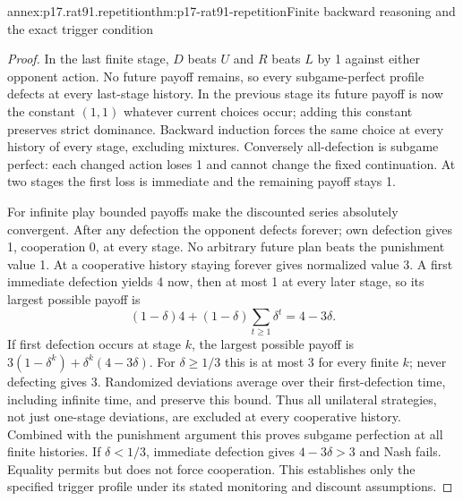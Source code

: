 \begin{annexitem}{annex:p17.rat91.repetition}{thm:p17-rat91-repetition}{Finite backward reasoning and the exact trigger condition}
\begin{proof}
In the last finite stage, \(D\) beats \(U\)
and \(R\) beats \(L\) by 1 against either
opponent action. No future payoff remains, so
every subgame-perfect profile defects at every
last-stage history. In the previous stage its
future payoff is now the constant \((1,1)\)
whatever current choices occur; adding this
constant preserves strict dominance. Backward
induction forces the same choice at every
history of every stage, excluding mixtures.
Conversely all-defection is subgame perfect:
each changed action loses 1 and cannot change
the fixed continuation. At two stages the first
loss is immediate and the remaining payoff
stays 1.

For infinite play bounded payoffs make the
discounted series absolutely convergent. After
any defection the opponent defects forever;
own defection gives 1, cooperation 0, at
every stage. No arbitrary future plan beats
the punishment value 1. At a cooperative
history staying forever gives normalized value
3. A first immediate defection yields 4 now,
then at most 1 at every later stage, so
its largest possible payoff is
\[
 (1-\delta)4+(1-\delta)\sum_{t\geq1}\delta^t
                             =4-3\delta.
\]
If first defection occurs at stage \(k\),
the largest possible payoff is
\(3(1-\delta^k)+\delta^k(4-3\delta)\).
For \(\delta\geq1/3\) this is at most 3
for every finite \(k\); never defecting
gives 3. Randomized deviations average over
their first-defection time, including infinite
time, and preserve this bound. Thus all
unilateral strategies, not just one-stage
deviations, are excluded at every cooperative
history. Combined with the punishment argument
this proves subgame perfection at all finite
histories. If \(\delta<1/3\), immediate
defection gives \(4-3\delta>3\) and Nash
fails. Equality permits but does not force
cooperation. This establishes only the
specified trigger profile under its stated
monitoring and discount assumptions.
\end{proof}
\end{annexitem}

